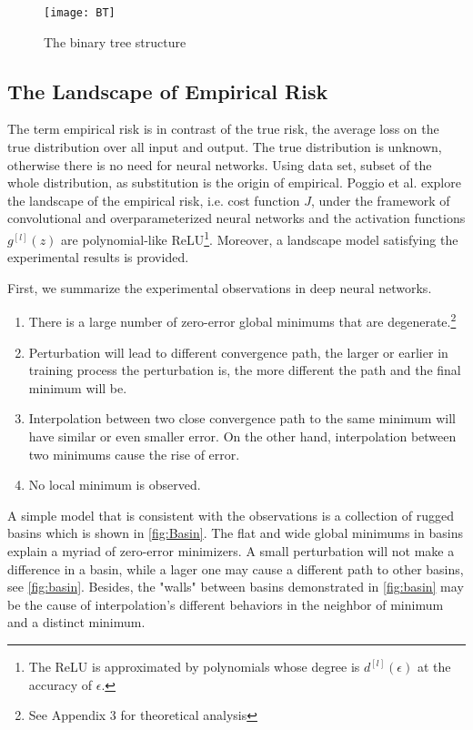 \begin{figure}[H]
    \centering
    \texttt{[image: BT]}
    \caption{\label{fig:BT}The binary tree structure}
\end{figure}


\subsection{The Landscape of Empirical Risk}
\label{ssec:empirical}
The term empirical risk is in contrast of the true risk, the average
loss on the true distribution over all input and output. The true 
distribution is unknown, otherwise there is no need for neural 
networks. Using data set, subset of the whole distribution, as 
substitution is the origin of empirical. Poggio et al. 
\parencite{poggio2017theory} explore the landscape of the empirical
risk, i.e. cost function $ J $, under the framework of convolutional
and overparameterized neural networks and the activation functions 
$ g^{[l]}(z) $ are polynomial-like ReLU\footnote{The ReLU is 
approximated by polynomials whose degree is $ d^{[l]}(\epsilon) $ at 
the accuracy of $ \epsilon $. }. Moreover, a landscape model satisfying
the experimental results is provided.

\par First, we summarize the experimental observations in deep neural
networks.
\begin{enumerate}
    \item There is a large number of zero-error global minimums 
    that are degenerate.\footnote{See Appendix 3 for
    theoretical analysis}
    \item Perturbation will lead to different convergence path, 
    the larger or earlier in training process the perturbation is,
    the more different the path and the final minimum will be.
    \item Interpolation between two close convergence path to the 
    same minimum will have similar or even smaller error. On the 
    other hand, interpolation between two minimums cause the 
    rise of error.
    \item No local minimum is observed.
\end{enumerate}



A simple model that is consistent with the observations is a collection
of rugged basins which is shown in \autoref{fig:Basin}. 
The flat and wide global minimums in basins explain
a myriad of zero-error minimizers. A small perturbation will not make 
a difference in a basin, while a lager one may cause a different path
to other basins, see \autoref{fig:basin}. Besides, the "walls" between
basins demonstrated in \autoref{fig:basin} may be the cause of 
interpolation's different behaviors in the neighbor of minimum and a
distinct minimum. 

